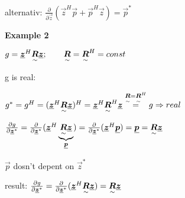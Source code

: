 alternativ: $ \frac{\partial}{\partial \vec{z}}(\vec{z}^H\vec{p}+\vec{p}^H\vec{z}) = \vec{p}^* $

\textbf{Example 2}

$g=\vec{z}^H\ma{R}\vec{z}; \qquad \ma{R}=\ma{R}^H=const$

g is real:

$g^*=g^H=(\vec{z}^H\ma{R}\vec{z})^H=\vec{z}^H\ma{R}^H\vec{z} 
\overset{\ma{R}=\ma{R}^H}{=} 
g\Rightarrow real $

$\frac{\partial g}{\partial \vec{z}^*}
=\frac{\partial}{\partial \vec{z}^*}(\vec{z}^H\underbrace{\ma{R}\vec{z}}_{\vec{p}})
=\frac{\partial}{\partial \vec{z}^*}(\vec{z}^H\vec{p})
=\vec{p}
=\ma{R}\vec{z}$

$\vec{p}$ dosn't depent on $\vec{z}^*$

result: $\frac{\partial g}{\partial \vec{z}^*}=\frac{\partial}{\partial \vec{z}^*}(\vec{z}^H\ma{R}\vec{z})=\ma{R}\vec{z}$
